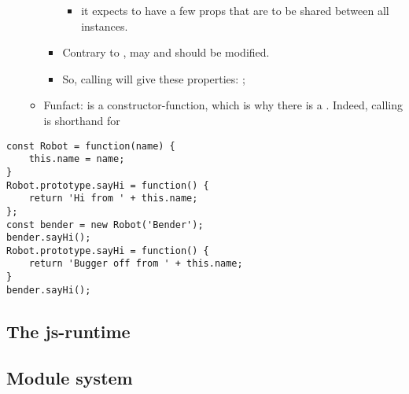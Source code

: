 \begin{itemize}
\begin{itemize}
\begin{itemize}
\begin{itemize}
                            \item it expects  to have a few props that are to be shared between all instances.
                        \end{itemize}
                    \item Contrary to ,  may and should be modified.
                    \item So, calling  will give  these properties: ;
                \end{itemize}
            \item Funfact:  is a constructor-function, which is why there is a . Indeed, calling  is shorthand for  
        \end{itemize}
\end{itemize}

\begin{lstlisting}
const Robot = function(name) {
    this.name = name;
}
Robot.prototype.sayHi = function() {
    return 'Hi from ' + this.name;
};
const bender = new Robot('Bender');
bender.sayHi();
Robot.prototype.sayHi = function() {
    return 'Bugger off from ' + this.name;
}
bender.sayHi();
\end{lstlisting}

\subsection{The js-runtime}

\subsection{Module system}

